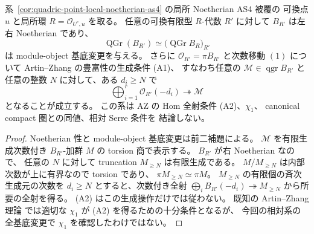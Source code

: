 \begin{corollary}
\label{cor:quadric-local-tails-basechange-generation}
系~\ref{cor:quadric-point-local-noetherian-as4} の局所 Noetherian AS4 被覆の
可換点 $u$ と局所環 $R=\mathcal O_{U^\circ,u}$ を取る。
任意の可換有限型 $R$-代数 $R'$ に対して
$B_{R'}$ は左右 Noetherian であり、
\[
 \operatorname{QGr}(B_{R'})
  \simeq\bigl(\operatorname{QGr}B_R\bigr)_{R'}
\]
は module-object 基底変更を与える。
さらに $\mathcal O_{R'}=\pi B_{R'}$ と次数移動 $(1)$ について
Artin--Zhang の豊富性の生成条件 (A1)、
すなわち任意の $\mathcal M\in\operatorname{qgr}B_{R'}$ と
任意の整数 $N$ に対して、ある $d_i\ge N$ で
\[
 \bigoplus_{i=1}^r\mathcal O_{R'}(-d_i)
     \twoheadrightarrow\mathcal M
\]
となることが成立する。
この系は AZ の Hom 全射条件 (A2)、$\chi_1$、
canonical compact 圏との同値、相対 Serre 条件を
結論しない。
\end{corollary}
\begin{proof}
Noetherian 性と module-object 基底変更は前二補題による。
$\mathcal M$ を有限生成次数付き $B_{R'}$-加群 $M$ の
torsion 商で表示する。
$B_{R'}$ が右 Noetherian なので、
任意の $N$ に対して truncation $M_{\ge N}$ は有限生成である。
$M/M_{\ge N}$ は内部次数が上に有界なので torsion であり、
$\pi M_{\ge N}\simeq\pi M$。
$M_{\ge N}$ の有限個の斉次生成元の次数を $d_i\ge N$
とすると、次数付き全射
$\bigoplus_i B_{R'}(-d_i)\twoheadrightarrow M_{\ge N}$
から所要の全射を得る。
(A2) はこの生成操作だけでは従わない。
既知の Artin--Zhang 理論
\cite[Theorem 4.5]{AZ1994} では適切な
$\chi_1$ が (A2) を得るための十分条件となるが、
今回の相対系の全基底変更で $\chi_1$ を確認したわけではない。
\end{proof}


